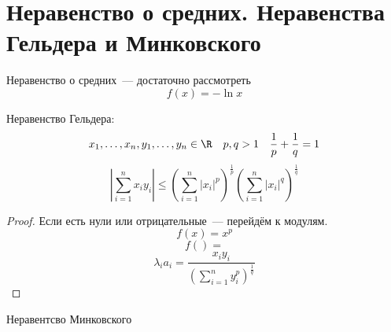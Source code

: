 ﻿\section{Неравенство о средних. Неравенства Гельдера и Минковского}

\begin{conseq}
Неравенство о средних~--- достаточно рассмотреть $$f(x) = -\ln x$$
\end{conseq}
\begin{conseq}
Неравенство Гельдера:
$$x_1, \ldots, x_n, y_1, \ldots, y_n \in \R \quad p,q > 1 \quad \frac1p + \frac1q = 1$$
$$\left|\sum_{i=1}^n x_iy_i\right| \leqslant \left(\sum_{i=1}^n |x_i|^p\right)^{\frac1p} \left(\sum_{i=1}^n |x_i|^q\right)^{\frac1q}$$
\end{conseq}
\begin{proof}
Если есть нули или отрицательные~--- перейдём к модулям.
$$f(x) = x^p$$
$$f\left(  \right) = $$
$$ \lambda_i a_i = \frac{x_iy_i}{(\sum_{i=1}^n y_i^p) ^ {\frac1q}}$$
\end{proof}

\begin{conseq}
Неравентсво Минковского
\end{conseq}